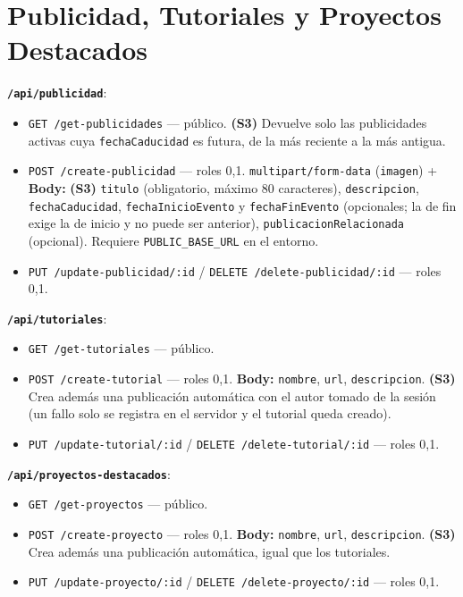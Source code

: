 \section{Publicidad, Tutoriales y Proyectos Destacados}
\textbf{\texttt{/api/publicidad}}:
\begin{itemize}
    \item \texttt{GET /get-publicidades} — público. \textbf{(S3)} Devuelve solo las publicidades activas cuya \texttt{fechaCaducidad} es futura, de la más reciente a la más antigua.
    \item \texttt{POST /create-publicidad} — roles 0,1. \texttt{multipart/form-data} (\texttt{imagen}) + \textbf{Body:} \textbf{(S3)} \texttt{titulo} (obligatorio, máximo 80 caracteres), \texttt{descripcion}, \texttt{fechaCaducidad}, \texttt{fechaInicioEvento} y \texttt{fechaFinEvento} (opcionales; la de fin exige la de inicio y no puede ser anterior), \texttt{publicacionRelacionada} (opcional). Requiere \texttt{PUBLIC\_BASE\_URL} en el entorno.
    \item \texttt{PUT /update-publicidad/:id} / \texttt{DELETE /delete-publicidad/:id} — roles 0,1.
\end{itemize}
\textbf{\texttt{/api/tutoriales}}:
\begin{itemize}
    \item \texttt{GET /get-tutoriales} — público.
    \item \texttt{POST /create-tutorial} — roles 0,1. \textbf{Body:} \texttt{nombre}, \texttt{url}, \texttt{descripcion}. \textbf{(S3)} Crea además una publicación automática con el autor tomado de la sesión (un fallo solo se registra en el servidor y el tutorial queda creado).
    \item \texttt{PUT /update-tutorial/:id} / \texttt{DELETE /delete-tutorial/:id} — roles 0,1.
\end{itemize}
\textbf{\texttt{/api/proyectos-destacados}}:
\begin{itemize}
    \item \texttt{GET /get-proyectos} — público.
    \item \texttt{POST /create-proyecto} — roles 0,1. \textbf{Body:} \texttt{nombre}, \texttt{url}, \texttt{descripcion}. \textbf{(S3)} Crea además una publicación automática, igual que los tutoriales.
    \item \texttt{PUT /update-proyecto/:id} / \texttt{DELETE /delete-proyecto/:id} — roles 0,1.
\end{itemize}

